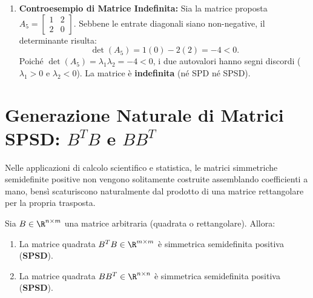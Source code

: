 \begin{example}
\begin{enumerate}
\begin{itemize}
    \end{itemize}
    \item \textbf{Controesempio di Matrice Indefinita:}
    Sia la matrice proposta $A_5 = \begin{bmatrix} 1 & 2 \\ 2 & 0 \end{bmatrix}$. Sebbene le entrate diagonali siano non-negative, il determinante risulta:
    \begin{equation}
        \det(A_5) = 1(0) - 2(2) = -4 < 0.
    \end{equation}
    Poich\'e $\det(A_5) = \lambda_1 \lambda_2 = -4 < 0$, i due autovalori hanno segni discordi ($\lambda_1 > 0$ e $\lambda_2 < 0$). La matrice \`e \textbf{indefinita} (n\'e SPD n\'e SPSD).
\end{enumerate}
\end{example}

\FloatBarrier
\section[Generazione Naturale di Matrici SPSD]{Generazione Naturale di Matrici SPSD: \texorpdfstring{$B^T B$}{B\textasciicircum T B} e \texorpdfstring{$B B^T$}{B B\textasciicircum T}}

Nelle applicazioni di calcolo scientifico e statistica, le matrici simmetriche semidefinite positive non vengono solitamente costruite assemblando coefficienti a mano, bens\`i scaturiscono naturalmente dal prodotto di una matrice rettangolare per la propria trasposta.

\begin{proposition}
\label{prop:btb-bbt-spsd}
Sia $B \in \R^{n \times m}$ una matrice arbitraria (quadrata o rettangolare). Allora:
\begin{enumerate}
    \item La matrice quadrata $B^T B \in \R^{m \times m}$ \`e simmetrica semidefinita positiva (\textbf{SPSD}).
    \item La matrice quadrata $B B^T \in \R^{n \times n}$ \`e simmetrica semidefinita positiva (\textbf{SPSD}).
\end{enumerate}
\end{proposition}

